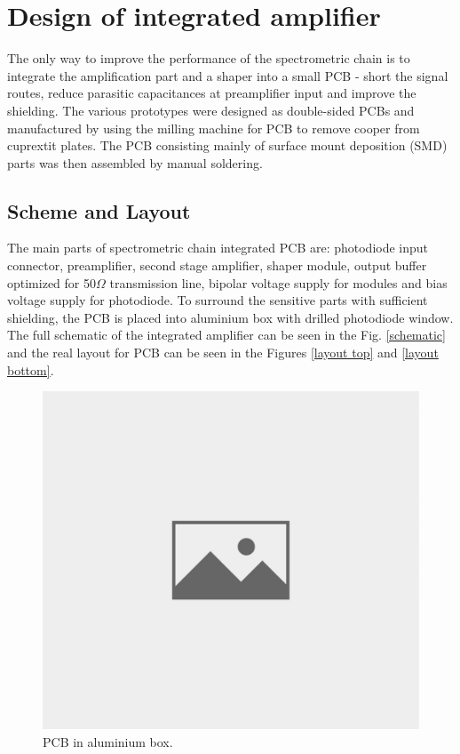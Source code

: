 \chapter{Design of integrated amplifier}
The only way to improve the performance of the spectrometric chain is to integrate the amplification part and a shaper into a small PCB - short the signal routes, reduce parasitic capacitances at preamplifier input and improve the shielding. The various prototypes were designed as double-sided PCBs and manufactured by using the milling machine for PCB to remove cooper from cuprextit plates. The PCB consisting mainly of surface mount deposition (SMD) parts was then assembled by manual soldering.

\section{Scheme and Layout}
The main parts of spectrometric chain integrated PCB are: photodiode input connector, preamplifier, second stage amplifier, shaper module, output buffer optimized for 50\nobreakspace$\Omega$ transmission line, bipolar voltage supply for modules and bias voltage supply for photodiode. To surround the sensitive parts with sufficient shielding, the PCB is placed into aluminium box with drilled photodiode window. The full schematic of the integrated amplifier can be seen in the Fig. \ref{schematic} and the real layout for PCB can be seen in the Figures \ref{layout top} and \ref{layout bottom}.



\begin{figure}[H]
 \centering
 \includegraphics[scale=0.35, angle = 0]{./pictures/NoPicture.jpg}
 \caption{PCB in aluminium box.}
 \label{PCBbox}
 
\end{figure}


